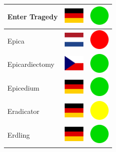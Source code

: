 \documentclass[12pt, a4paper, twoside]{report}
\begin{document}
\begin{center}
\begin{longtable}{|p{5cm}|p{2cm}|p{2cm}|}
 Enter Tragedy                                              & \includegraphics[width=1cm]{../4x3/de} &   \includegraphics[width=1cm]{../likes/y} \\ \hline
 Epica                                                      & \includegraphics[width=1cm]{../4x3/nl} &   \includegraphics[width=1cm]{../likes/n} \\ \hline
 Epicardiectomy                                             & \includegraphics[width=1cm]{../4x3/cz} &   \includegraphics[width=1cm]{../likes/y} \\ \hline
 Epicedium                                                  & \includegraphics[width=1cm]{../4x3/de} &   \includegraphics[width=1cm]{../likes/y} \\ \hline
 Eradicator                                                 & \includegraphics[width=1cm]{../4x3/de} &   \includegraphics[width=1cm]{../likes/m} \\ \hline
 Erdling                                                    & \includegraphics[width=1cm]{../4x3/de} &   \includegraphics[width=1cm]{../likes/y} \\ \hline

\end{longtable}
\end{center}
\end{document}
